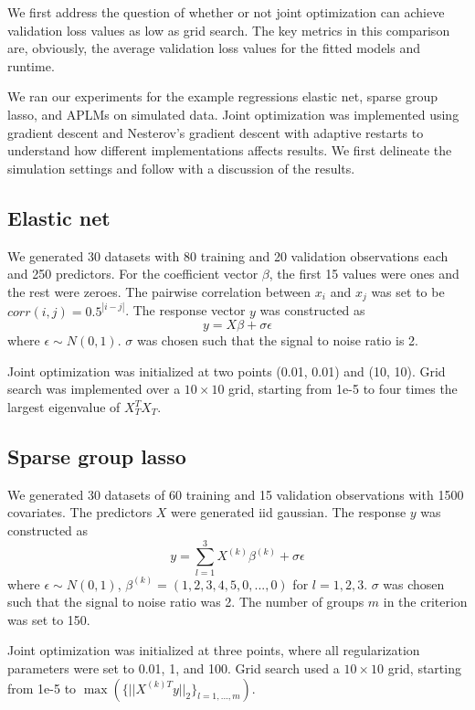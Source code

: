 \documentclass[10pt,letterpaper]{article}
\begin{document}
We first address the question of whether or not joint optimization can achieve validation loss values as low as grid search. The key metrics in this comparison are, obviously, the average validation loss values for the fitted models and runtime.

We ran our experiments for the example regressions elastic net, sparse group lasso, and APLMs on simulated data. Joint optimization was implemented using gradient descent and Nesterov's gradient descent with adaptive restarts to understand how different implementations affects results. We first delineate the simulation settings and follow with a discussion of the results.

\subsection{Elastic net}
We generated 30 datasets with 80 training and 20 validation observations each and 250 predictors. For the coefficient vector $\beta$, the first 15 values were ones and the rest were zeroes. The pairwise correlation between $x_i$ and $x_j$ was set to be $corr(i,j) = 0.5^{|i-j|}$. The response vector $y$ was constructed as
\begin{equation}
y = X\beta + \sigma \epsilon
\end{equation}
where $\epsilon \sim N(0, 1)$. $\sigma$ was chosen such that the signal to noise ratio is 2.

Joint optimization was initialized at two points (0.01, 0.01) and (10, 10). Grid search was implemented over a $10 \times 10$ grid, starting from 1e-5 to four times the largest eigenvalue of $X_T^T X_T$.

\subsection{Sparse group lasso}

We generated 30 datasets of 60 training and 15 validation observations with 1500 covariates. The predictors $X$ were generated iid gaussian. The response $y$ was constructed as
\begin{equation}
y = \sum\limits_{l=1}^3 X^{(k)} \beta^{(k)} + \sigma \epsilon
\end{equation}
where $\epsilon \sim N(0, 1)$, $\beta^{(k)} = (1, 2, 3, 4, 5, 0, ..., 0)$ for $l = 1, 2, 3$. $\sigma$ was chosen such that the signal to noise ratio was 2. The number of groups $m$ in the criterion was set to 150.

Joint optimization was initialized at three points, where all regularization parameters were set to 0.01, 1, and 100. Grid search used a $10 \times 10$ grid, starting from 1e-5 to $\max(\{||X^{(k)T}y ||_2\}_{l=1,..., m})$.
\end{document}
